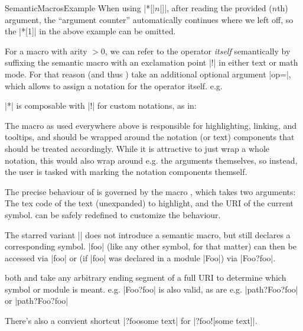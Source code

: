 \begin{smodule}{SemanticMacrosExample}
 When using |*[|$n$|]|, after reading the provided ($n$th) argument,
  the ``argument counter'' automatically 
 continues where we left off, so the |*[1]| in the above example
 can be omitted.

   For a macro with arity $>0$, we can refer to the operator
   \emph{itself} semantically by suffixing the semantic macro
   with an exclamation point |!| in either text or math mode.
   For that reason  (and thus ) take an
   additional optional argument |op=|, which allows to assign
   a notation for the operator itself. e.g.

  |*| is composable with |!| for custom notations, as in:


 The macro  as used everywhere above is responsible
 for highlighting, linking, and tooltips, and should be wrapped
 around the notation (or text) components that should be treated
 accordingly. While it is attractive to just wrap a whole notation,
 this would also wrap around e.g. the arguments themselves, so
 instead, the user is tasked with marking the notation components
 themself.

 The precise behaviour of  is governed by
 the macro , which takes two arguments: The tex code
 of the text
 (unexpanded) to highlight, and the URI of the current symbol.
  can be safely redefined to customize the behaviour.


 The starred variant || does not introduce a semantic
 macro, but still declares a corresponding symbol. |foo| (like
 any other symbol, for that matter) can
 then be accessed via |{foo}| or (if |foo| was declared
 in a module |Foo|) via |{Foo}?{foo}|.

 both  and  take any
 arbitrary ending segment of a full URI to determine
 which symbol or module is meant. e.g.
 |{Foo?foo}| is also valid, as are e.g.
 |{path?Foo}?{foo}| or
 |{path?Foo?foo}|

 There's also a convient shortcut |{?foo}{some text}| for
 |{?foo}![some text]|.

 \end{smodule}


